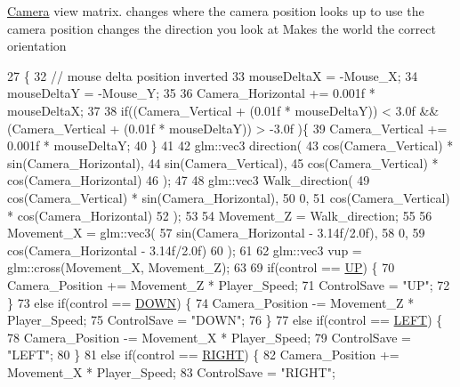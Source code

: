 \hyperlink{class_camera}{Camera} view matrix. changes where the camera position looks up to use the camera position changes the direction you look at Makes the world the correct orientation
\begin{DoxyCode}
27                                                                               \{
32         \textcolor{comment}{// mouse delta position inverted}
33     mouseDeltaX = -Mouse\_X;
34     mouseDeltaY = -Mouse\_Y;
35 
36         Camera\_Horizontal += 0.001f * mouseDeltaX;
37 
38         \textcolor{keywordflow}{if}((Camera\_Vertical + (0.01f * mouseDeltaY)) < 3.0f && (Camera\_Vertical + (0.01f * mouseDeltaY)) > 
      -3.0f )\{
39             Camera\_Vertical += 0.001f * mouseDeltaY;
40         \}
41 
42         glm::vec3 direction(
43         cos(Camera\_Vertical) * sin(Camera\_Horizontal),
44         sin(Camera\_Vertical),
45         cos(Camera\_Vertical) * cos(Camera\_Horizontal)
46     );
47     
48         glm::vec3 Walk\_direction(
49         cos(Camera\_Vertical) * sin(Camera\_Horizontal),
50         0,
51         cos(Camera\_Vertical) * cos(Camera\_Horizontal)
52     );
53         
54     Movement\_Z = Walk\_direction;
55 
56     Movement\_X = glm::vec3(
57         sin(Camera\_Horizontal - 3.14f/2.0f),
58         0,
59         cos(Camera\_Horizontal - 3.14f/2.0f)
60     );
61 
62     glm::vec3 vup = glm::cross(Movement\_X, Movement\_Z);
63         
69         \textcolor{keywordflow}{if}(control == \hyperlink{common_8h_a0da83e35f29c11f7f3c637234f2149f9aba595d8bca8bc5e67c37c0a9d89becfa}{UP}) \{
70         Camera\_Position +=  Movement\_Z * Player\_Speed;
71         ControlSave = \textcolor{stringliteral}{"UP"};
72     \}
73         \textcolor{keywordflow}{else} \textcolor{keywordflow}{if}(control == \hyperlink{common_8h_a0da83e35f29c11f7f3c637234f2149f9a9b0b4a95b99523966e0e34ffdadac9da}{DOWN}) \{
74         Camera\_Position -= Movement\_Z * Player\_Speed;
75         ControlSave = \textcolor{stringliteral}{"DOWN"};
76     \} 
77         \textcolor{keywordflow}{else} \textcolor{keywordflow}{if}(control == \hyperlink{common_8h_a0da83e35f29c11f7f3c637234f2149f9adb45120aafd37a973140edee24708065}{LEFT}) \{
78         Camera\_Position -= Movement\_X * Player\_Speed;
79         ControlSave = \textcolor{stringliteral}{"LEFT"};
80     \} 
81         \textcolor{keywordflow}{else} \textcolor{keywordflow}{if}(control == \hyperlink{common_8h_a0da83e35f29c11f7f3c637234f2149f9aec8379af7490bb9eaaf579cf17876f38}{RIGHT}) \{
82         Camera\_Position += Movement\_X * Player\_Speed;
83         ControlSave = \textcolor{stringliteral}{"RIGHT"};

\end{DoxyCode}
